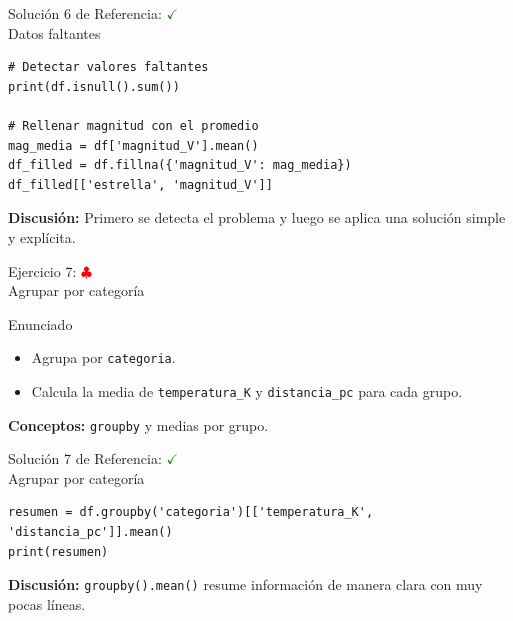\documentclass[10pt]{beamer}
\begin{document}
\begin{solutionblock}
\begin{frame}[fragile]{Solución 6 de Referencia: \hfill \textcolor{green}{$\checkmark$} \\ Datos faltantes}
\begin{verbatim}
# Detectar valores faltantes
print(df.isnull().sum())

# Rellenar magnitud con el promedio
mag_media = df['magnitud_V'].mean()
df_filled = df.fillna({'magnitud_V': mag_media})
df_filled[['estrella', 'magnitud_V']]
\end{verbatim}
\textbf{Discusión:} Primero se detecta el problema y luego se aplica una solución simple y explícita.
\end{frame}
\end{solutionblock}

\begin{frame}{Ejercicio 7: \hfill \textcolor{red}{$\clubsuit$} \\ Agrupar por categoría}
\begin{block}{Enunciado}
  \begin{itemize}
    \item Agrupa por \texttt{categoria}.
    \item Calcula la media de \texttt{temperatura\_K} y \texttt{distancia\_pc} para cada grupo.
  \end{itemize}
\end{block}
\textbf{Conceptos:} \texttt{groupby} y medias por grupo.
\end{frame}

\begin{solutionblock}
\begin{frame}[fragile]{Solución 7 de Referencia: \hfill \textcolor{green}{$\checkmark$} \\ Agrupar por categoría}
\begin{verbatim}
resumen = df.groupby('categoria')[['temperatura_K', 'distancia_pc']].mean()
print(resumen)
\end{verbatim}
\textbf{Discusión:} \texttt{groupby().mean()} resume información de manera clara con muy pocas líneas.
\end{frame}
\end{solutionblock}
\end{document}
